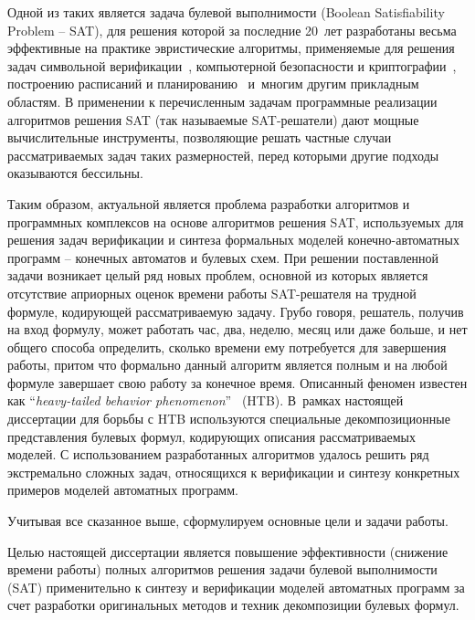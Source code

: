 Одной из таких является задача булевой выполнимости (Boolean Satisfiability Problem \--- SAT), для решения которой за последние 20~лет разработаны весьма эффективные на практике эвристические алгоритмы, применяемые для решения задач символьной верификации~\autocite{kroening2021}, компьютерной безопасности и криптографии~\autocite{bard2009}, построению расписаний и планированию~\autocite{prestwich2021} и~многим другим прикладным областям.
В применении к перечисленным задачам программные реализации алгоритмов решения SAT (так называемые SAT-решатели) дают мощные вычислительные инструменты, позволяющие решать частные случаи рассматриваемых задач таких размерностей, перед которыми другие подходы оказываются бессильны.

Таким образом, актуальной является проблема разработки алгоритмов и программных комплексов на основе алгоритмов решения SAT, используемых для решения задач верификации и синтеза формальных моделей конечно-автоматных программ \--- конечных автоматов и булевых схем.
При решении поставленной задачи возникает целый ряд новых проблем, основной из которых является отсутствие априорных оценок времени работы SAT-решателя на трудной формуле, кодирующей рассматриваемую задачу.
Грубо говоря, решатель, получив на вход формулу, может работать час, два, неделю, месяц или даже больше, и нет общего способа определить, сколько времени ему потребуется для завершения работы, притом что формально данный алгоритм является полным и на любой формуле завершает свою работу за конечное время.
Описанный феномен известен как \enquote{\textit{heavy-tailed behavior phenomenon}}~\autocite{gomes2009} (HTB).
В~рамках настоящей диссертации для борьбы с HTB используются специальные декомпозиционные представления булевых формул, кодирующих описания рассматриваемых моделей.
С использованием разработанных алгоритмов удалось решить ряд экстремально сложных задач, относящихся к верификации и синтезу конкретных примеров моделей автоматных программ.

Учитывая все сказанное выше, сформулируем основные цели и задачи работы.


\aim
%
Целью настоящей диссертации является повышение эффективности (снижение времени работы) полных алгоритмов решения задачи булевой выполнимости (SAT) применительно к синтезу и верификации моделей автоматных программ за счет разработки оригинальных методов и техник декомпозиции булевых формул.


